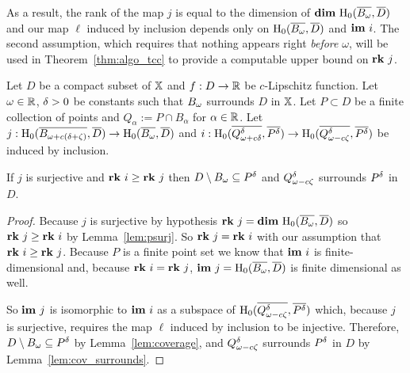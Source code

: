 As a result, the rank of the map $j$ is equal to the dimension of $\mathbf{dim}~\mathrm{H}_0(\overline{B_\omega}, \overline{D})$ and our map $\ell$ induced by inclusion depends only on $\mathrm{H}_0(\overline{B_\omega}, \overline{D})$ and $\mathbf{im}~i$.
The second assumption, which requires that nothing appears right \emph{before} $\omega$, will be used in Theorem~\ref{thm:algo_tcc} to provide a computable upper bound on $\mathbf{rk}~j$.

\begin{theorem}\label{thm:geo_tcc}
  Let $D$ be a compact subset of $\mathbb{X}$ and $f : D\to\mathbb{R}$ be $c$-Lipschitz function.
  Let $\omega\in\mathbb{R}$, ${\delta} > 0$ be constants such that $B_{\omega}$ surrounds $D$ in $\mathbb{X}$.
  Let $P\subset D$ be a finite collection of points and $Q_\alpha := P\cap B_\alpha$ for $\alpha\in\mathbb{R}$.
  Let $j : \mathrm{H}_0(\overline{B_{\omega+c(\delta+\zeta)}},\overline{D})\to \mathrm{H}_0(\overline{B_{\omega}},\overline{D})$ and $i : \mathrm{H}_0(\overline{Q_{\omega + c{\delta}}^{\delta}}, \overline{P^{\delta}})\to \mathrm{H}_0(\overline{Q_{\omega - c\zeta}^{\delta}}, \overline{P^{\delta}})$ be induced by inclusion.

  If $j$ is surjective and $\mathbf{rk}~i\geq \mathbf{rk}~j$ then $D\setminus B_{\omega}\subseteq P^{\delta}$ and $Q_{\omega - c\zeta}^{\delta}$ surrounds $P^{\delta}$ in $D$.
\end{theorem}
\begin{proof}
  Because $j$ is surjective by hypothesis $\mathbf{rk}~j = \mathbf{dim}~\mathrm{H}_0(\overline{B_{\omega}},\overline{D})$ so $\mathbf{rk}~j\geq \mathbf{rk}~i$ by Lemma~\ref{lem:psurj}.
  So $\mathbf{rk}~j = \mathbf{rk}~i$ with our assumption that $\mathbf{rk}~i\geq \mathbf{rk}~j$.
  Because $P$ is a finite point set we know that $\mathbf{im}~i$ is finite-dimensional and, because $\mathbf{rk}~i = \mathbf{rk}~j$, $\mathbf{im}~j=\mathrm{H}_0(\overline{B_{\omega}}, \overline{D})$ is finite dimensional as well.

  So $\mathbf{im}~j$ is isomorphic to $\mathbf{im}~i$ as a subspace of $\mathrm{H}_0(\overline{Q_{\omega - c\zeta}^{\delta}}, \overline{P^{\delta}})$ which, because $j$ is surjective, requires the map $\ell$ induced by inclusion to be injective.
  Therefore, $D\setminus B_\omega\subseteq P^{\delta}$ by Lemma~\ref{lem:coverage}, and $Q_{\omega - c\zeta}^{\delta}$ surrounds $P^{\delta}$ in $D$ by Lemma~\ref{lem:cov_surrounds}.
\end{proof}
